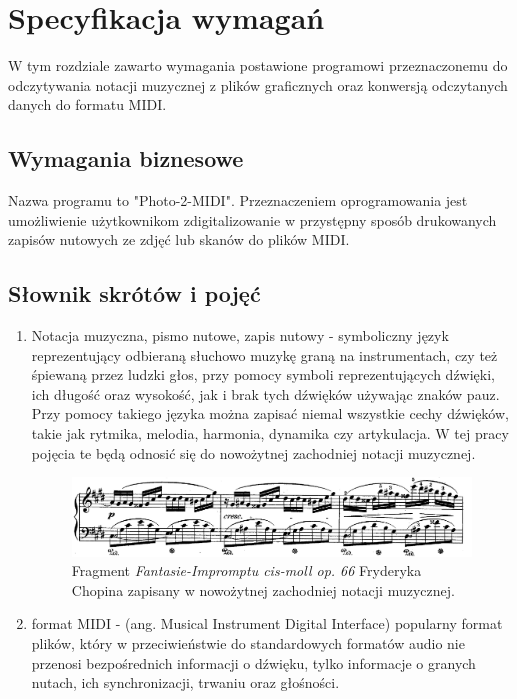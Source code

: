 \chapter{Specyfikacja wymagań}
W tym rozdziale zawarto wymagania postawione programowi przeznaczonemu do odczytywania notacji muzycznej z plików graficznych oraz konwersją odczytanych danych do formatu MIDI.

\section{Wymagania biznesowe}
Nazwa programu to "Photo-2-MIDI". Przeznaczeniem oprogramowania jest umożliwienie użytkownikom zdigitalizowanie w przystępny sposób drukowanych zapisów nutowych ze zdjęć lub skanów do plików MIDI.

\section{Słownik skrótów i pojęć}

	\begin{enumerate}
		\item Notacja muzyczna, pismo nutowe, zapis nutowy - symboliczny język reprezentujący odbieraną słuchowo muzykę graną na instrumentach, czy też śpiewaną przez ludzki głos, przy pomocy symboli reprezentujących dźwięki, ich długość oraz wysokość, jak i brak tych dźwięków używając znaków pauz. Przy pomocy takiego języka można zapisać niemal wszystkie cechy dźwięków, takie jak rytmika, melodia, harmonia, dynamika czy artykulacja. W tej pracy pojęcia te będą odnosić się do nowożytnej zachodniej notacji muzycznej.
		
		\begin{figure}
			\centering
			\includegraphics[width=14cm]{images/chopin_fastasie_impromtu_no_4_op_66.png}
			\caption{Fragment \textit{Fantasie-Impromptu cis-moll op. 66} Fryderyka Chopina zapisany w nowożytnej zachodniej notacji muzycznej. }
			\label{fig:chopin_impromptu}
		\end{figure}
		
		\item format MIDI - (ang. Musical Instrument Digital Interface) popularny format plików, który w przeciwieństwie do standardowych formatów audio nie przenosi bezpośrednich informacji o dźwięku, tylko informacje o granych nutach, ich synchronizacji, trwaniu oraz głośności. 
	\end{enumerate}


